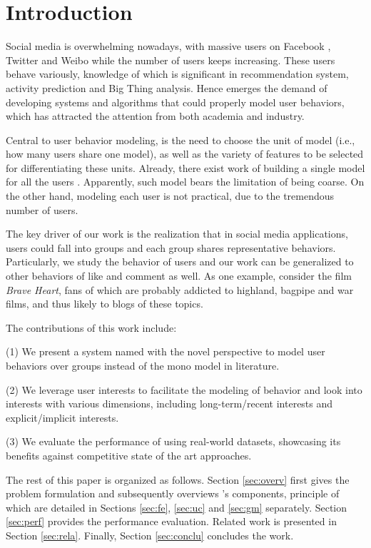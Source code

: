 \section{Introduction}
\label{sec:intro}

Social media is overwhelming nowadays, with massive users on Facebook , Twitter  and Weibo  while the number of users keeps increasing.
These users behave variously, knowledge of which is significant in recommendation system, activity prediction and Big Thing analysis.
Hence emerges the demand of developing systems and algorithms that could properly model user behaviors, which has attracted the attention from both academia and industry.

Central to user behavior modeling, is the need to choose the unit of model (i.e., how many users share one model), as well as the variety of features to be selected for differentiating these units.
Already, there exist work of building a single model for all the users .
Apparently, such model bears the limitation of being coarse.
On the other hand, modeling each user is not practical, due to the tremendous number of users.

The key driver of our work is the realization that in social media applications, users could fall into groups and each group shares representative behaviors.
Particularly, we study the \retg{} behavior of users and our work can be generalized to other behaviors of like and comment as well.
As one example, consider the film \textit{Brave Heart}, fans of which are probably addicted to highland, bagpipe and war films, and thus likely to \ret{} blogs of these topics.

  The contributions of this work include:

\stab(1) We present a system named \sys{} with the novel perspective to model user behaviors over groups instead of the mono model in literature.

\stab(2) We leverage user interests to facilitate the modeling of \retg{} behavior and look into interests with various dimensions, including long-term/recent interests and explicit/implicit interests.

\stab(3) We evaluate the performance of \sys{} using real-world datasets, showcasing its benefits against competitive state of the art approaches.



 The rest of this paper is organized as follows.
Section \ref{sec:overv} first gives the problem formulation and subsequently overviews \sys{}'s components, principle of which are detailed in Sections \ref{sec:fe}, \ref{sec:uc} and \ref{sec:gm} separately.
Section \ref{sec:perf} provides the performance evaluation.
Related work is presented in Section \ref{sec:rela}.
Finally, Section \ref{sec:conclu} concludes the work.











